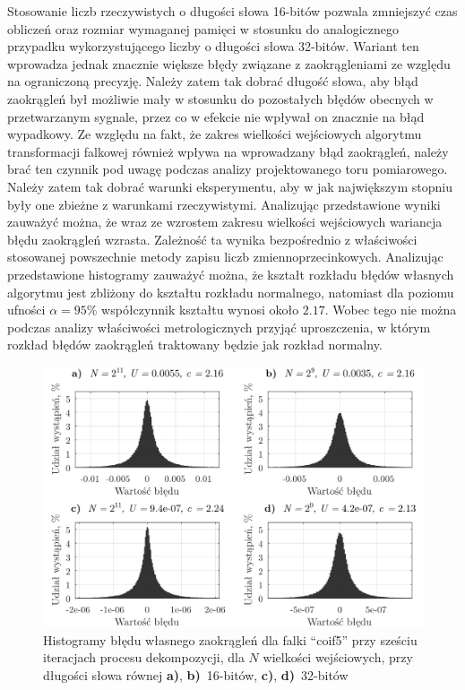 Stosowanie liczb rzeczywistych o długości słowa 16-bitów pozwala zmniejszyć czas obliczeń oraz rozmiar wymaganej pamięci w stosunku do analogicznego przypadku wykorzystującego liczby o długości słowa 32-bitów. Wariant ten wprowadza jednak znacznie większe błędy związane z zaokrągleniami ze względu na ograniczoną precyzję. Należy zatem tak dobrać długość słowa, aby błąd zaokrągleń był możliwie mały w stosunku do pozostałych błędów obecnych w przetwarzanym sygnale, przez co w efekcie nie wpływał on znacznie na błąd wypadkowy. Ze względu na fakt, że zakres wielkości wejściowych algorytmu transformacji falkowej również wpływa na wprowadzany błąd zaokrągleń, należy brać ten czynnik pod uwagę podczas analizy projektowanego toru pomiarowego. Należy zatem tak dobrać warunki eksperymentu, aby w jak największym stopniu były one zbieżne z warunkami rzeczywistymi. Analizując przedstawione wyniki zauważyć można, że wraz ze wzrostem zakresu wielkości wejściowych wariancja błędu zaokrągleń wzrasta. Zależność ta wynika bezpośrednio z właściwości stosowanej powszechnie metody zapisu liczb zmiennoprzecinkowych. Analizując przedstawione histogramy zauważyć można, że kształt rozkładu błędów własnych algorytmu jest zbliżony do kształtu rozkładu normalnego, natomiast dla poziomu ufności $\alpha = 95\%$ współczynnik kształtu wynosi około $2.17$. Wobec tego nie można podczas analizy właściwości metrologicznych przyjąć uproszczenia, w którym rozkład błędów zaokrągleń traktowany będzie jak rozkład normalny.

\begin{figure}[htb!]
\begin{center}
\includegraphics{obrazki/hist_numerr_coif5}
\caption{Histogramy błędu własnego zaokrągleń dla falki \enquote{coif5} przy sześciu iteracjach procesu dekompozycji, dla $N$ wielkości wejściowych, przy długości słowa równej \textbf{a)}, \textbf{b)}~16-bitów, \textbf{c)}, \textbf{d)}~32-bitów \label{fig_dwt_rhist_coif5}}
\end{center}
\end{figure}

